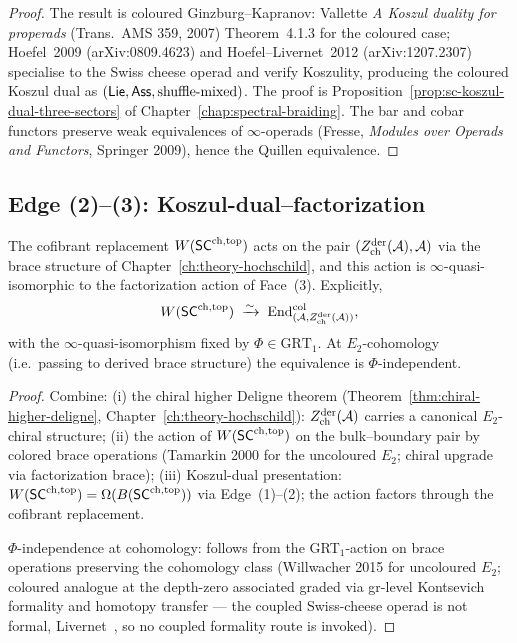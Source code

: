 \begin{proof}
The result is coloured Ginzburg--Kapranov: Vallette
\textit{A Koszul duality for properads} (Trans.\ AMS 359, 2007)
Theorem~4.1.3 for the coloured case; Hoefel~2009 (arXiv:0809.4623)
and Hoefel--Livernet~2012 (arXiv:1207.2307) specialise to the Swiss
cheese operad and verify Koszulity, producing the coloured Koszul
dual as $(\mathsf{Lie},\mathsf{Ass},\text{shuffle-mixed})$. The proof is
Proposition~\ref{prop:sc-koszul-dual-three-sectors} of
Chapter~\ref{chap:spectral-braiding}. The bar and
cobar functors preserve weak equivalences of $\infty$-operads
(Fresse, \textit{Modules over Operads and Functors}, Springer 2009),
hence the Quillen equivalence.
\end{proof}

\subsection{Edge (2)--(3): Koszul-dual--factorization}\label{subsec:edge-23}

\begin{theorem}\label{thm:edge-23}%
The cofibrant replacement $W(\mathsf{SC}^{\mathrm{ch},\mathrm{top}})$ acts on the pair
$(Z^{\mathrm{der}}_{\mathrm{ch}}(\mathcal{A}),\mathcal{A})$ via the brace structure of
Chapter~\ref{ch:theory-hochschild}, and this action is
$\infty$-quasi-isomorphic to the factorization action of
Face~(3). Explicitly,
\begin{equation}
 W(\mathsf{SC}^{\mathrm{ch},\mathrm{top}})
 \;\xrightarrow{\sim}\;
 \mathrm{End}^{\mathrm{col}}_{(\mathcal{A},Z^{\mathrm{der}}_{\mathrm{ch}}(\mathcal{A}))},
\end{equation}
with the $\infty$-quasi-isomorphism fixed by $\Phi\in\mathrm{GRT}_1$.
At $E_2$-cohomology (i.e.\ passing to derived brace structure) the
equivalence is $\Phi$-independent.
\end{theorem}

\begin{proof}
Combine:
(i) the chiral higher Deligne theorem
(Theorem~\ref{thm:chiral-higher-deligne}, Chapter~\ref{ch:theory-hochschild}):
$Z^{\mathrm{der}}_{\mathrm{ch}}(\mathcal{A})$ carries a canonical
$E_2$-chiral structure;
(ii) the action of $W(\mathsf{SC}^{\mathrm{ch},\mathrm{top}})$ on the bulk--boundary pair by
colored brace operations (Tamarkin 2000 for the uncoloured
$E_2$; chiral upgrade via factorization brace);
(iii) Koszul-dual presentation: $W(\mathsf{SC}^{\mathrm{ch},\mathrm{top}})=\Omega(B(\mathsf{SC}^{\mathrm{ch},\mathrm{top}}))$
via Edge~(1)--(2); the action factors through the cofibrant
replacement.

$\Phi$-independence at cohomology: follows from the
GRT$_1$-action on brace operations preserving the cohomology class
(Willwacher 2015 for uncoloured $E_2$; coloured analogue at the
depth-zero associated graded via gr-level Kontsevich formality
and homotopy transfer --- the coupled Swiss-cheese operad is not
formal, Livernet~\cite{Liv15}, so no coupled formality route is
invoked).
\end{proof}

